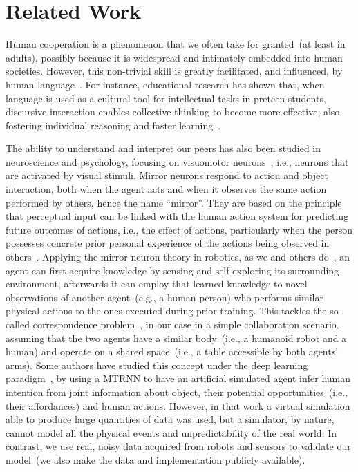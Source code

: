 
\section{Related Work}
\label{sec:related_work}

Human cooperation is a phenomenon that we often take for granted~(at least in adults), possibly because it is widespread and intimately embedded into human societies.
However, this non-trivial skill is greatly facilitated, and influenced, by human language~\cite{mueller:2000:psych}.
For instance, educational research has shown that, when language is used as a cultural tool for intellectual tasks in preteen students, discursive interaction enables collective thinking to become more effective, also fostering individual reasoning and faster learning~\cite{rojas:2003:ijer}. %

The ability to understand and interpret our peers has also been studied in neuroscience and psychology, focusing on visuomotor neurons~\cite{rizzolatti:2001:nrn}, i.e., neurons that are activated by visual stimuli.
Mirror neurons respond to action and object interaction, both when the agent acts and when it observes the same action performed by others, hence the name ``mirror''.
They are based on the principle that perceptual input can be linked with the human action system for predicting future outcomes of actions, i.e., the effect of actions, particularly when the person possesses concrete prior personal experience of the actions being observed in others~\cite{aglioti:2008:basketball,knoblich:2001:psychsci}.
Applying the mirror neuron theory in robotics, as we and others do~\cite{gazzola:2007:neuroimage,lopes:2009:ab}, an agent can first acquire knowledge by sensing and self-exploring its surrounding environment, %
afterwards it can employ that learned knowledge to novel observations of another agent~(e.g., a human person) who performs similar physical actions to the ones executed during prior training.
This tackles the so-called correspondence problem~\cite{nehaniv:2002:correspondence}, in our case in a simple collaboration scenario, assuming that the two agents have a similar body~(i.e., a humanoid robot and a human) and operate on a shared space~(i.e., a table accessible by both agents' arms).
Some authors have studied this concept under the deep learning paradigm~\cite{kim:2017:nn}, by using a \ac{MTRNN} to have an artificial simulated agent infer human intention from joint information about object, their potential opportunities~(i.e., their affordances) and human actions.
However, in that work a virtual simulation able to produce large quantities of data was used, but a simulator, by nature, cannot model all the physical events and unpredictability of the real world.
In contrast, we use real, noisy data acquired from robots and sensors to validate our model~(we also make the data and implementation publicly available).

